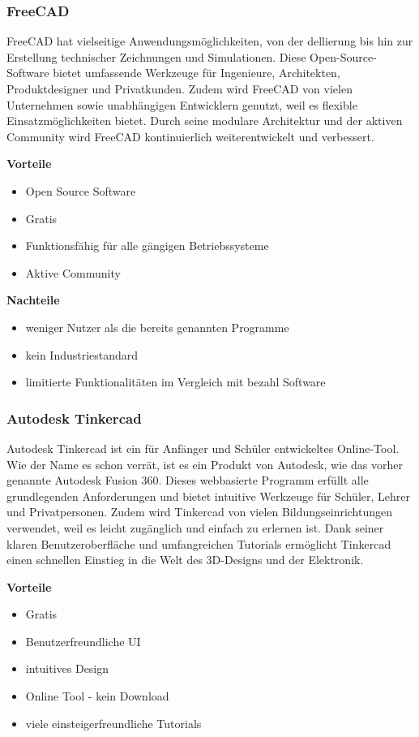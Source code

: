 \subsubsection{FreeCAD}
FreeCAD hat vielseitige Anwendungsmöglichkeiten, von der dellierung bis hin zur Erstellung technischer Zeichnungen und Simulationen. Diese Open-Source-Software bietet umfassende Werkzeuge für Ingenieure, Architekten, Produktdesigner und Privatkunden. Zudem wird FreeCAD von vielen Unternehmen sowie unabhängigen Entwicklern genutzt, weil es flexible Einsatzmöglichkeiten bietet. Durch seine modulare Architektur und der aktiven Community wird FreeCAD kontinuierlich weiterentwickelt und verbessert.
\cite{FreeCAD}  \cite{FreeCAD_2}

\textbf{Vorteile}
\begin{itemize}
	\item Open Source Software
	\item Gratis
	\item Funktionsfähig für alle gängigen Betriebssysteme
	\item Aktive Community	 
\end{itemize}

\textbf{Nachteile}
\begin{itemize}
	\item weniger Nutzer als die bereits genannten Programme
	\item kein Industriestandard
	\item limitierte Funktionalitäten im Vergleich mit bezahl Software
\end{itemize}
\cite{FreeCADReviews}

\subsubsection{Autodesk Tinkercad}
Autodesk Tinkercad ist ein für Anfänger und Schüler entwickeltes Online-Tool. Wie der Name es schon verrät, ist es ein Produkt von Autodesk, wie das vorher genannte Autodesk Fusion 360. Dieses webbasierte Programm erfüllt alle grundlegenden Anforderungen und bietet intuitive Werkzeuge für Schüler, Lehrer und Privatpersonen. Zudem wird Tinkercad von vielen Bildungseinrichtungen verwendet, weil es leicht zugänglich und einfach zu erlernen ist. Dank seiner klaren Benutzeroberfläche und umfangreichen Tutorials ermöglicht Tinkercad einen schnellen Einstieg in die Welt des 3D-Designs und der Elektronik. 
\cite{Tinkercad}

\textbf{Vorteile}
\begin{itemize}
	\item Gratis
	\item Benutzerfreundliche UI
	\item intuitives Design
	\item Online Tool - kein Download 	
	\item viele einsteigerfreundliche Tutorials 
\end{itemize}


